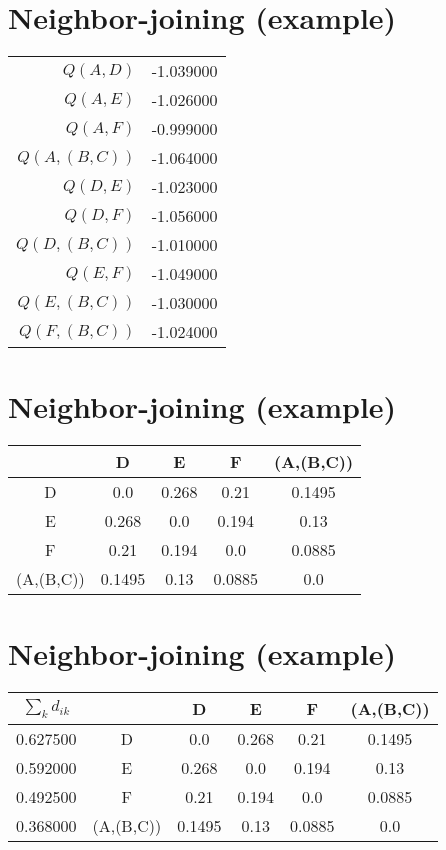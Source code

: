 \documentclass[landscape]{foils}
\begin{document}
\section*{Neighbor-joining (example)}
\begin{table}[htdp]
\begin{center}
\begin{tabular}{|r|c|}
\hline
$Q(A,D)$ & -1.039000 \\
$Q(A,E)$ & -1.026000 \\
$Q(A,F)$ & -0.999000 \\
{\color{red} $Q(A,(B,C))$} & {\color{red} -1.064000} \\
$Q(D,E)$ & -1.023000 \\
$Q(D,F)$ & -1.056000 \\
$Q(D,(B,C))$ & -1.010000 \\
$Q(E,F)$ & -1.049000 \\
$Q(E,(B,C))$ & -1.030000 \\
$Q(F,(B,C))$ & -1.024000 \\
\hline
\end{tabular}
\end{center}
\end{table}%



\myNewSlide
\section*{Neighbor-joining (example)}
\begin{table}[htdp]
\begin{center}
\begin{tabular}{|c|c|c|c|c|}
\hline
   & D & E & F & (A,(B,C))  \\ 
\hline
D & 0.0 & 0.268 & 0.21 & 0.1495 \\
E & 0.268 & 0.0 & 0.194 & 0.13 \\
F & 0.21 & 0.194 & 0.0 & 0.0885 \\
(A,(B,C)) & 0.1495 & 0.13 & 0.0885 & 0.0 \\
\hline
\end{tabular}
\end{center}
\end{table}%


\myNewSlide
\section*{Neighbor-joining (example)}
\begin{table}[htdp]
\begin{center}
\begin{tabular}{|c|c|c|c|c|c|}
\hline
$\sum_{k} d_{ik}$ &  & D & E & F & (A,(B,C))  \\
\hline
0.627500 & D & 0.0 & 0.268 & 0.21 & 0.1495 \\
0.592000 & E & 0.268 & 0.0 & 0.194 & 0.13 \\
0.492500 & F & 0.21 & 0.194 & 0.0 & 0.0885 \\
0.368000 & (A,(B,C)) & 0.1495 & 0.13 & 0.0885 & 0.0 \\
\hline
\end{tabular}
\end{center}
\end{table}%
\end{document}
